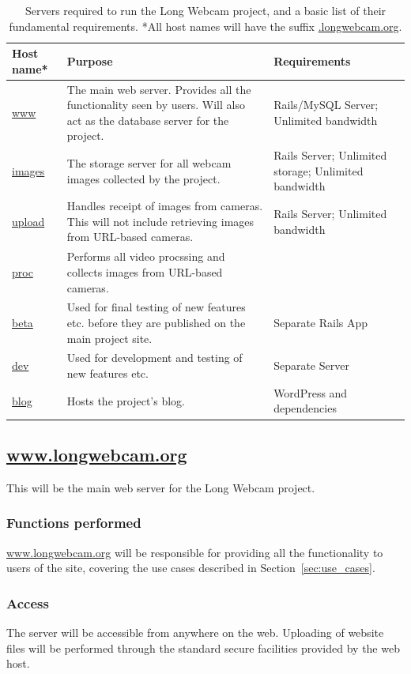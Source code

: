 \documentclass[11pt]{article}
\begin{document}
\begin{table}[h]
\begin{tabular}{ | p{0.45in} | p{4in} | p{1.45in} | }
\hline
\textbf{Host name*} & \textbf{Purpose} & \textbf{Requirements} \\
\hline
\url{www} & The main web server. Provides all the functionality seen by users. Will also act as the database server for the project. & Rails/MySQL Server; Unlimited bandwidth \\
\hline
\url{images} & The storage server for all webcam images collected by the project. & Rails Server; Unlimited storage; Unlimited bandwidth \\
\hline
\url{upload} & Handles receipt of images from cameras. This will not include retrieving images from URL-based cameras. & Rails Server; Unlimited bandwidth \\
\hline
\url{proc} & Performs all video procssing and collects images from URL-based cameras. & \\
\hline
\url{beta} & Used for final testing of new features etc. before they are published on the main project site. & Separate Rails App \\
\hline
\url{dev} & Used for development and testing of new features etc. & Separate Server \\
\hline
\url{blog} & Hosts the project's blog. & WordPress and dependencies \\
\hline
\end{tabular}
\caption{Servers required to run the Long Webcam project, and a basic list of their fundamental requirements. *All host names will have the suffix \protect\url{.longwebcam.org}.}
\label{tab:hosts}
\end{table}


\subsection{\protect\url{www.longwebcam.org}}
This will be the main web server for the Long Webcam project.

\subsubsection{Functions performed}
\url{www.longwebcam.org} will be responsible for providing all the functionality to users of the site, covering the use cases described in Section~\ref{sec:use_cases}.

\subsubsection{Access}
The server will be accessible from anywhere on the web. Uploading of website files will be performed through the standard secure facilities provided by the web host.
\end{document}
